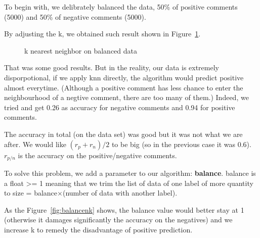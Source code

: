 \documentclass{article}
\begin{document}
To begin with, we delibrately balanced the data, 50\% of positive comments (5000)
and 50\% of negative comments (5000).

By adjusting the k, we obtained such result shown in Figure~\ref{fig:knn1}.

\begin{figure}[htbp]
  \centering
  \caption{k nearest neighbor on balanced data}
  \label{fig:knn1}
\end{figure}

That was some good results. But in the reality, our data is extremely disporpotional,
if we apply knn directly, the algorithm would predict positive almost everytime. (Although
a positive comment has less chance to enter the neighbourhood of a negtive comment,
there are too many of them.) Indeed, we tried and get 0.26 as accuracy for negative comments and 0.94 for
positive comments.

The accuracy in total (on the data set) was good but it was not what we are after. We would like
$(r_p+r_n)/2$ to be big (so in the previous case it was 0.6). $r_{p/n}$ is the accuracy on the positive/negative comments.

To solve this problem, we add a parameter to our algorithm: \textbf{balance}.
balance is a float >= 1 meaning that we trim the list of data of one label
of more quantity to size = balance$\times$(number of data with another label).

As the Figure~\ref{fig:balancenk} shows, the balance value would
better stay at 1 (otherwise it damages significantly
the accuracy on the negatives) and we increase k to
remedy the disadvantage of positive prediction.
\end{document}
